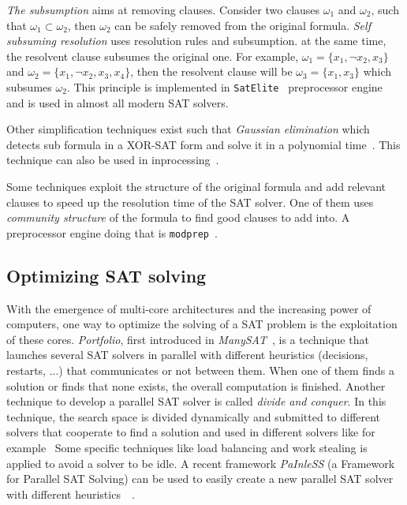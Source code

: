 \emph{The subsumption} aims at removing  clauses. Consider two clauses $\omega_1$ and $\omega_2$, such that
$\omega_1 \subset  \omega_2$, then $\omega_2$ can be safely removed from the original formula.
\emph{Self subsuming resolution} uses resolution rules and subsumption. at the same time,
the resolvent clause subsumes the original one. For example, $\omega_1 = \{x_1, \neg x_2, x_3\}$ and $\omega_2 = \{x_1, \neg x_2, x_3, x_4\}$,
 then the resolvent clause will be $\omega_3 = \{x_1, x_3\}$ which subsumes $\omega_2$. This principle
is implemented in \texttt{SatElite}~\cite{een2005effective} preprocessor engine and is used in almost all modern SAT solvers.

Other simplification techniques exist such that \emph{Gaussian elimination} which detects sub formula in a XOR-SAT
form and solve it in a polynomial time~\cite{moore2011nature}. This technique can also be used in inprocessing~\cite{soos2010enhanced}. 

Some techniques exploit the structure of the original formula and add relevant clauses to speed up the resolution
time of the SAT solver. One of them uses \textit{community structure} of the formula to find good clauses to add into.
A preprocessor engine doing that is \texttt{modprep}~\cite{ansotegui2015using}.


\subsection{Optimizing SAT solving}
With the emergence of multi-core architectures and the increasing power of computers, one way to optimize the solving
of a SAT problem is the exploitation of these cores. %
\emph{Portfolio}, first introduced in \emph{ManySAT}~\cite{hamadi2008manysat}, is a technique that launches several SAT solvers in parallel with different heuristics (decisions, restarts, ...) that 
communicates or not between them. When one of them finds a solution or finds that none exists, the overall computation is finished.
Another technique to develop a parallel SAT solver is called \emph{divide and conquer}. In this technique,
the search space is divided  dynamically and submitted to different solvers that cooperate to find a solution and used in
different solvers like for example~\cite{chu2008pminisat, lewis2007multithreaded}
 Some specific techniques like load balancing and work stealing is applied to avoid a solver to be idle.
A recent framework \emph{PaInleSS} (a Framework for Parallel SAT Solving) can be used to easily create a new parallel 
SAT solver with different heuristics~\cite{le2017painless}~\cite{le2019modular}. 

